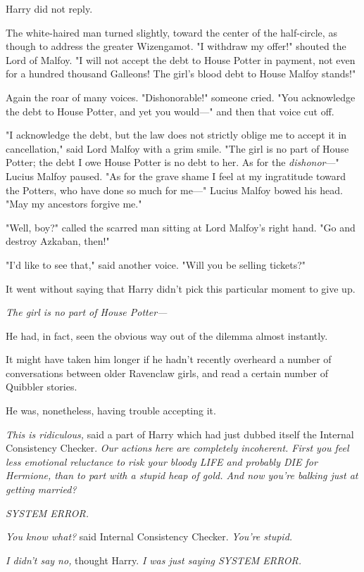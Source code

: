 Harry did not reply.

The white-haired man turned slightly, toward the center of the half-circle, as 
though to address the greater Wizengamot. "I withdraw my offer!" shouted the 
Lord of Malfoy. "I will not accept the debt to House Potter in payment, not 
even for a hundred thousand Galleons! The girl's blood debt to House Malfoy 
stands!"

Again the roar of many voices. "Dishonorable!" someone cried. "You acknowledge 
the debt to House Potter, and yet you would---" and then that voice cut off.

"I acknowledge the debt, but the law does not strictly oblige me to accept it 
in cancellation," said Lord Malfoy with a grim smile. "The girl is no part of 
House Potter; the debt I owe House Potter is no debt to her. As for the 
\emph{dishonor}---" Lucius Malfoy paused. "As for the grave shame I feel at my 
ingratitude toward the Potters, who have done so much for me---" Lucius Malfoy 
bowed his head. "May my ancestors forgive me."

"Well, boy?" called the scarred man sitting at Lord Malfoy's right hand. "Go 
and destroy Azkaban, then!"

"I'd like to see that," said another voice. "Will you be selling tickets?"

It went without saying that Harry didn't pick this particular moment to give up.

\emph{The girl is no part of House Potter---}

He had, in fact, seen the obvious way out of the dilemma almost instantly.

It might have taken him longer if he hadn't recently overheard a number of 
conversations between older Ravenclaw girls, and read a certain number of 
Quibbler stories.

He was, nonetheless, having trouble accepting it.

\emph{This is ridiculous,} said a part of Harry which had just dubbed itself 
the Internal Consistency Checker. \emph{Our actions here are completely 
incoherent. First you feel less emotional reluctance to risk your bloody LIFE 
and probably DIE for Hermione, than to part with a stupid heap of gold. And now 
you're balking just at getting married?}

\emph{SYSTEM ERROR.}

\emph{You know what?} said Internal Consistency Checker. \emph{You're stupid.}

\emph{I didn't say no,} thought Harry. \emph{I was just saying SYSTEM ERROR.}

